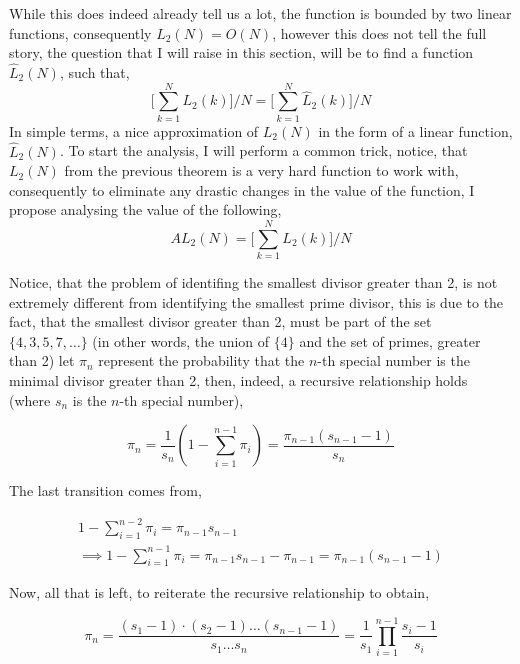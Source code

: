 \documentclass{article}
\begin{document}
While this does indeed already tell us a lot, the function is bounded by two linear functions, consequently \(L_2(N) = O(N)\), however this does not tell the full story, the question that I will raise in this section, will be to find a function \(\widehat{L}_2(N)\), such that,
\begin{equation}
	\biggl[ \sum_{k = 1}^N L_2(k) \biggr] / N = \biggl[ \sum_{k = 1}^N \widehat{L}_2(k) \biggr] / N
\end{equation}
In simple terms, a nice approximation of \(L_2(N)\) in the form of a linear function, \(\widehat{L}_2(N)\). To start the analysis, I will perform a common trick, notice, that \(L_2(N)\) from the previous theorem is a very hard function to work with, consequently to eliminate any drastic changes in the value of the function, I propose analysing the value of the following,
\begin{equation}
	AL_2(N) = \biggl[ \sum_{k = 1}^N L_2(k) \biggr] / N
\end{equation}

Notice, that the problem of identifing the smallest divisor greater than 2, is not extremely different from identifying the smallest prime divisor, this is due to the fact, that the smallest divisor greater than 2, must be part of the set \(\{4, 3, 5, 7, \ldots\}\) (in other words, the union of \(\{4\}\) and the set of primes, greater than 2)
let $\pi_n$ represent the probability that the $n$-th special number is the minimal divisor greater than 2, then, indeed, a recursive relationship holds (where $s_n$ is the $n$-th special number),

\begin{equation}
	\pi_n = \frac{1}{s_n}\left( 1 - \sum_{i = 1}^{n - 1}\pi_i \right) = \frac{\pi_{n - 1}(s_{n - 1} - 1)}{s_n}
\end{equation}

The last transition comes from,

\begin{multline}
	 1 - \sum_{i = 1}^{n - 2} \pi_i  = \pi_{n - 1} s_{n - 1} 
	 \\ \implies 1 - \sum_{i = 1}^{n - 1}\pi_i = \pi_{n - 1}s_{n - 1} - \pi_{n - 1} = \pi_{n - 1}(s_{n - 1} - 1)
\end{multline}

Now, all that is left, to reiterate the recursive relationship to obtain,

\begin{equation}\label{problamatic_moment_1}
	\pi_n = \frac{(s_1 - 1) \cdot (s_2 - 1) \ldots (s_{n - 1} - 1)}{s_1 \ldots s_n} = \frac{1}{s_1} \prod_{i = 1}^{n - 1} \frac{s_i - 1}{s_i} 
\end{equation}
\end{document}

